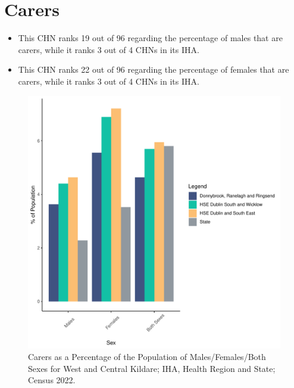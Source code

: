 \documentclass{article}
\begin{document}
\section{Carers}\label{sect:Carers}
\begin{itemize}
\item This CHN ranks  19 out of 96 regarding the percentage of males that are carers, while it ranks   3 out of 4 CHNs in its IHA.
\item This CHN ranks  22 out of 96 regarding the percentage of females that are carers, while it ranks   3 out of 4 CHNs in its IHA.
\end{itemize}
\begin{figure}[H]
	\centering
	\includegraphics[width = 150mm]{../figures/CareED.pdf}
	\caption{Carers as a Percentage of the Population of Males/Females/Both Sexes for West and Central Kildare; IHA, Health Region and State; Census 2022.}
	\label{fig:2ae19629-1a6a-13a3-e055-000000000001}
	\end{figure}
\end{document}
